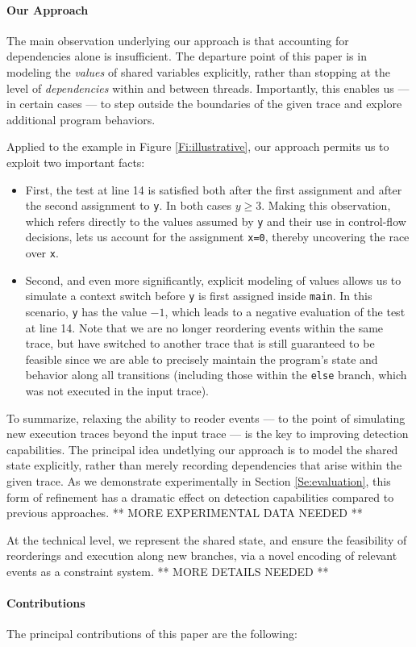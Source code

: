 \paragraph{Our Approach} The main observation underlying our approach is that accounting for dependencies alone is insufficient. The departure point of this paper is in modeling the \emph{values} of shared variables explicitly, rather than stopping at the level of \emph{dependencies} within and between threads. Importantly, this enables us --- in certain cases ---  to step outside the boundaries of the given trace and explore additional program behaviors.

Applied to the example in Figure \ref{Fi:illustrative}, our approach permits us to exploit two important facts:
\begin{itemize}
	\item First, the test at line 14 is satisfied both after the first assignment and after the second assignment to {\tt y}. In both cases $y \geq 3$. Making this observation, which refers directly to the values assumed by {\tt y} and their use in control-flow decisions, lets us account for the assignment {\tt x=0}, thereby uncovering the race over {\tt x}.
	\item Second, and even more significantly, explicit modeling of values allows us to simulate a context switch before {\tt y} is first assigned inside {\tt main}. In this scenario, {\tt y} has the value $-1$, which leads to a negative evaluation of the test at line 14. Note that we are no longer reordering events within the same trace, but have switched to another trace that is still guaranteed to be feasible since we are able to precisely maintain the program's state and behavior along all transitions (including those within the {\tt else} branch, which was not executed in the input trace).
\end{itemize}
To summarize, relaxing the ability to reoder events --- to the point of simulating new execution traces beyond the input trace --- is the key to improving detection capabilities. The principal idea undetlying our approach is to model the shared state explicitly, rather than merely recording dependencies that arise within the given trace. 
As we demonstrate experimentally in Section \ref{Se:evaluation}, this form of refinement has a dramatic effect on detection capabilities compared to previous approaches. ** MORE EXPERIMENTAL DATA NEEDED **

At the technical level, we represent the shared state, and ensure the feasibility of reorderings and execution along new branches, via a novel encoding of relevant events as a constraint system. ** MORE DETAILS NEEDED **

\paragraph{Contributions} The principal contributions of this paper are the following:
